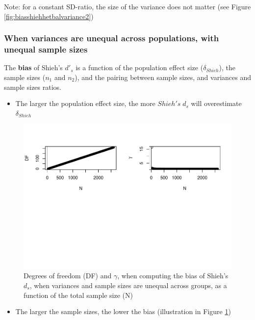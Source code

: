 \documentclass[
  man]{apa6}
\providecommand{\tightlist}{%
  \setlength{\itemsep}{0pt}\setlength{\parskip}{0pt}}
\begin{document}
Note: for a constant SD-ratio, the size of the variance does not matter (see Figure \ref{fig:biasshiehhetbalvariance2})

\hypertarget{when-variances-are-unequal-across-populations-with-unequal-sample-sizes-1}{%
\subsubsection{When variances are unequal across populations, with unequal sample sizes}\label{when-variances-are-unequal-across-populations-with-unequal-sample-sizes-1}}

The \textbf{bias} of Shieh's \(d'_s\) is a function of the population effect size (\(\delta_{Shieh}\)), the sample sizes (\(n_1\) and \(n_2\)), and the pairing between sample sizes, and variances and sample sizes ratios.

\begin{itemize}
\tightlist
\item
  The larger the population effect size, the more \(Shieh's \; d_s\) will overestimate \(\delta_{Shieh}\)
\end{itemize}

\begin{figure}
\centering
\includegraphics{Theoretical-Bias-of-all-estimators-as-a-function-of-population-parameters_files/figure-latex/biasshiehhetunbalNsize2-1.pdf}
\caption{\label{fig:biasshiehhetunbalNsize2}Degrees of freedom (DF) and \(\gamma\), when computing the bias of Shieh's \(d_s\), when variances and sample sizes are unequal across groups, as a function of the total sample size (N)}
\end{figure}

\begin{itemize}
\tightlist
\item
  The larger the sample sizes, the lower the bias (illustration in Figure \ref{fig:biasshiehhetunbalNsize2})
\end{itemize}
\end{document}
